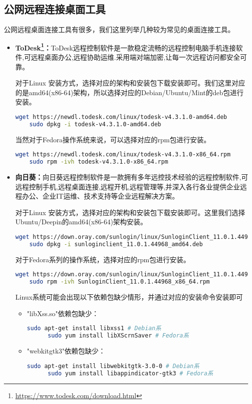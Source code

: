 \documentclass[lang=cn,a4paper,newtx]{elegantpaper}
\begin{document}
\subsection{公网远程连接桌面工具}
公网远程桌面连接工具有很多，我们这里列举几种较为常见的桌面连接工具。
\begin{itemize}
  \item \textbf{ToDesk\footnote{\url{https://www.todesk.com/download.html}}：}ToDesk远程控制软件是一款稳定流畅的远程控制电脑手机连接软件,可远程桌面办公,远程协助运维.采用端对端加密,让每一次远程访问都安全可靠。
  
  对于Linux 安装方式，选择对应的架构和安装包下载安装即可。我们这里对应的是amd64(x86-64)架构，所以选择对应的Debian/Ubuntu/Mint的deb包进行安装。
  \begin{lstlisting}[language=bash]
    wget https://newdl.todesk.com/linux/todesk-v4.3.1.0-amd64.deb
    sudo dpkg -i todesk-v4.3.1.0-amd64.deb
  \end{lstlisting}

  当然对于Fedora操作系统来说，可以选择对应的rpm包进行安装。
  \begin{lstlisting}[language=bash]
    wget https://newdl.todesk.com/linux/todesk-v4.3.1.0-x86_64.rpm
    sudo rpm -ivh todesk-v4.3.1.0-x86_64.rpm
  \end{lstlisting}
  \item \textbf{向日葵：}向日葵远程控制软件是一款拥有多年远控技术经验的远程控制软件,可远程控制手机,远程桌面连接,远程开机,远程管理等,并深入各行各业提供企业远程办公、企业IT运维、技术支持等企业远程解决方案。
  
  对于Linux 安装方式，选择对应的架构和安装包下载安装即可。这里我们选择Ubuntu/Deepin的amd64(x86-64)架构安装。
  \begin{lstlisting}[language=bash]
    wget https://down.oray.com/sunlogin/linux/SunloginClient_11.0.1.44968_amd64.deb
    sudo dpkg -i sunloginclient_11.0.1.44968_amd64.deb
  \end{lstlisting}
  
  对于Fedora系列的操作系统，选择对应的rpm包进行安装。
  \begin{lstlisting}[language=bash]
    wget https://down.oray.com/sunlogin/linux/SunloginClient_11.0.1.44968_amd64.rpm
    sudo rpm -ivh SunloginClient_11.0.1.44968_x86_64.rpm
  \end{lstlisting}

  Linux系统可能会出现以下依赖包缺少情形，并通过对应的安装命令安装即可
  \begin{itemize}
    \item "libXss.so"依赖包缺少：
    \begin{lstlisting}[language=bash]
      sudo apt-get install libxss1 # Debian系
      sudo yum install libXScrnSaver # Fedora系
    \end{lstlisting}
    \item "webkitgtk3"依赖包缺少：
    \begin{lstlisting}[language=bash]
      sudo apt-get install libwebkitgtk-3.0-0 # Debian系
      sudo yum install libappindicator-gtk3 # Fedora系
    \end{lstlisting}
  \end{itemize}
  

\end{itemize}
\end{document}
